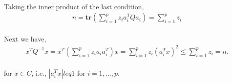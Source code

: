 \paragraph{}
Taking the inner product of the last condition,
\begin{align*}
n = \textbf{tr}(\sum_{i=1}^{p}z_ia_i^TQa_i) = \sum_{i=1}^{p}z_i
\end{align*}
\paragraph{}
Next we have,
\begin{align*}
x^TQ^{-1}x = x^T( \sum_{i=1}^{p}z_ia_ia_i^T)x = \sum_{i=1}^{p}z_i(a_i^Tx)^2 \leq \sum_{i=1}^{p}z_i = n.
\end{align*}
\paragraph{}
for $x \in C$, i.e., $ |a_i^Tx| leq 1$ for $i =1,...,p$.